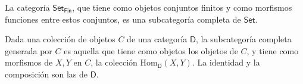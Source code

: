 \documentclass[../main.tex]{subfiles}
\begin{document}
\begin{exampleap}
    La categor\'ia $\mathsf{Set}_{\mathsf{Fin}}$, que tiene como objetos conjuntos finitos y como morfismos funciones entre estos conjuntos, es una subcategor\'ia completa de $\mathsf{Set}$.
\end{exampleap}

\begin{exampleap}
    Dada una colecci\'on de objetos $C$ de una categor\'ia $\mathsf{D}$, la subcategor\'ia completa generada por $C$ es aquella que tiene como objetos los objetos de $C$, y tiene como morfismos de $X,Y$ en $C$, la colecci\'on $\text{Hom}_\mathsf{D}(X,Y)$.
    La identidad y la composici\'on son las de $\mathsf{D}$.
\end{exampleap}
\end{document}
